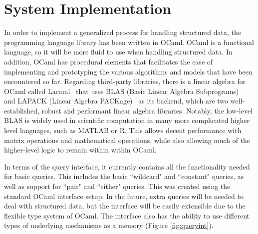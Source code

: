 \documentclass{sig-alternate}
\begin{document}

\section{System Implementation}
\label{sec:sysimp}

In order to implement a generalized process for handling structured data, the programming language 
library has been written in OCaml. OCaml is a functional language, so it will be more fluid to use 
when handling structured data. In addition, OCaml has procedural elements that facilitates the ease 
of implementing and prototyping the various algorithms and models that have been encountered so far. 
Regarding third-party libraries, there is a linear algebra for OCaml called Lacaml~\cite{lacaml} that uses BLAS 
(Basic Linear Algebra Subprograms)~\cite{blas}
and LAPACK (Linear Algebra PACKage)~\cite{lapack}
as its backend, which are two well-established, robust and performant linear algebra 
libraries. Notably, the low-level BLAS is widely used in scientific computation in many more complicated
higher level languages, such as MATLAB or R. This allows decent performance with matrix operations
and mathematical operations, while also allowing
much of the higher-level logic to remain within within OCaml.

In terms of the query interface, it currently contains all the functionality needed for basic 
queries.  This includes the basic ``wildcard" and ``constant" queries, as well as support for 
``pair" and ``either" queries. This was created using the standard OCaml interface setup. In the 
future, extra queries will be needed to deal with structured data, but the interface will be easily 
extensible due to the flexible type system of OCaml. The interface also has the ability to use 
different types of underlying mechanisms as a memory (Figure \ref{fig:queryint}).
\end{document}
